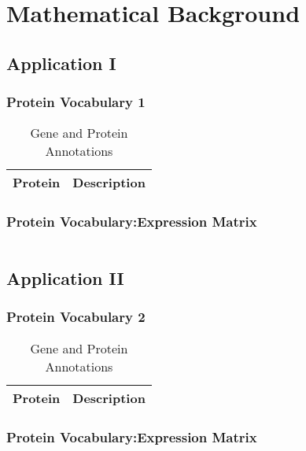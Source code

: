 \section{Mathematical Background}

\subsection{Application I}

\subsubsection{Protein Vocabulary 1}

\begin{table}[H]\tiny
\caption{Gene and Protein Annotations}	
	\begin{tabular}{p{1cm}p{6cm}}
		\hline
		Protein & Description \\   
		\hline
	\hline
\end{tabular}
\end{table}

\subsubsection{Protein Vocabulary:Expression Matrix}

\begin{equation}
\end{equation}

\subsection{Application II}

\subsubsection{Protein Vocabulary 2}

\begin{table}[H]\tiny
\caption{Gene and Protein Annotations}	
	\begin{tabular}{p{1cm}p{6cm}}
		\hline
		Protein & Description \\   
		\hline
	\hline
\end{tabular}
\end{table}

\subsubsection{Protein Vocabulary:Expression Matrix}

